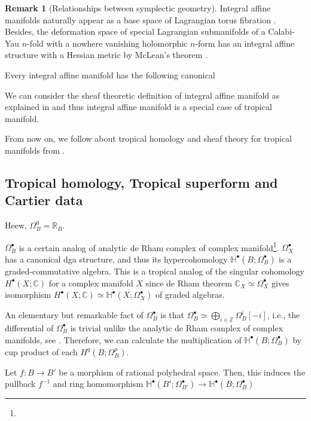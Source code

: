 \documentclass[a4paper,dvipdfmx,reqno,12pt]{amsart}
\theoremstyle{definition}
\newtheorem{Rmk}[Thm]{Remark}
\newcommand{\C}{\mathbb{C}}%
\newcommand{\R}{\mathbb{R}}%
\newcommand{\Z}{\mathbb{Z}}%
\newcommand{\mb}[1]{\mathbb{#1}}%
\numberwithin{equation}{section}
\begin{document}
\begin{Rmk}[{Relationships between symplectic geometry}]
Integral affine manifolds naturally appear 
as a base space of Lagrangian torus fibration 
\cite{duistermaatGlobalActionangleCoordinates1980a}. 
Besides, the deformation space of 
special Lagrangian submanifolds of
a Calabi-Yau $n$-fold with a nowhere vanishing 
holomorphic $n$-form has 
an integral affine structure with 
a Hessian metric by McLean's theorem \cite{MR1664890}.

Every integral affine manifold has the following canonical
\end{Rmk}

We can consider the sheaf theoretic definition of 
integral affine manifold as explained 
in \cite[2.1]{kontsevichAffineStructuresNonArchimedean2006a} 
and thus integral affine manifold is a special case of 
tropical manifold.

From now on, we follow about tropical homology and sheaf 
theory for tropical manifolds
from \cite{MR3903579,gross2019sheaftheoretic}.

\subsection{Tropical homology, Tropical superform and Cartier data}

Heew, $\Omega_B^{0}=\R_B$.

$\Omega_B^{\bullet}$ is a certain analog of analytic
de Rham complex of complex manifold\footnote{
}.
$\Omega_X^{\bullet}$ has a canonical dga structure, 
and thus its hypercohomology 
$\mb{H}^{\bullet}(B;\Omega_B^{\bullet})$ is a 
graded-commutative algebra. 
This is a tropical analog of the singular cohomology
$H^{\bullet}(X;\C)$ for a complex manifold $X$ since 
de Rham theorem $\C_X \simeq \Omega_X^{\bullet}$ 
gives isomorphism 
$H^{\bullet}(X;\C)\simeq \mb{H}^{\bullet}(X;\Omega_X^{\bullet})$
of graded algebras. 

An elementary but remarkable fact of 
$\Omega_B^{\bullet}$ is that $\Omega_B^{\bullet}\simeq 
\bigoplus_{i\in \Z}\Omega_B^{i}[-i]$, i.e., the differential 
of $\Omega_B^{\bullet}$ is trivial unlike the analytic de Rham complex
of complex manifolds, see \cite[Corollary 2.15]{epub36262}.
Therefore, we can calculate the multiplication of 
$\mb{H}^{\bullet}(B;\Omega_B^{\bullet})$ by 
cup product of each $H^{q}(B;\Omega_B^{p})$.

Let $f\colon B\to B'$ be a morphism of rational polyhedral 
space. Then, this induces the pullback $f^{-1}$ and 
ring homomorphism $\mb{H}^{\bullet}(B';\Omega_{B'}^{\bullet})\to \mb{H}^{\bullet}(B;\Omega_B^{\bullet})$
\end{document}
